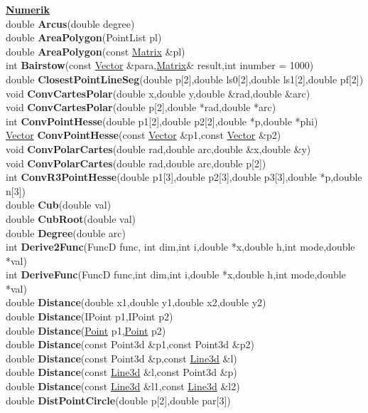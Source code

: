 \documentclass[10pt,titlepage]{article}
\newcommand{\subtitle}[1]{{\noindent\bf#1}}
\def\functionlistentry#1#2#3#4#5#6{\noindent #1 {\bf #2}(#3) \dotfill #6\\}
\begin{document}
{{\subtitle{\hyperlink{SECTION:numeric}{Numerik}}\\
\functionlistentry{double}{Arcus}{double degree}{1348}{numeric}{}
\functionlistentry{double}{AreaPolygon}{PointList pl}{1379}{numeric}{}
\functionlistentry{double}{AreaPolygon}{const \hyperlink{Matrix}{Matrix} \&pl}{1380}{numeric}{}
\functionlistentry{int}{Bairstow}{const \hyperlink{Vector}{Vector} \&para,\hyperlink{Matrix}{Matrix}\& result,int inumber = 1000}{1399}{numeric}{}
\functionlistentry{double}{ClosestPointLineSeg}{double p[2],double ls0[2],double ls1[2],double pf[2]}{1374}{numeric}{}
\functionlistentry{void}{ConvCartesPolar}{double x,double y,double \&rad,double \&arc}{1366}{numeric}{}
\functionlistentry{void}{ConvCartesPolar}{double p[2],double *rad,double *arc}{1367}{numeric}{}
\functionlistentry{int}{ConvPointHesse}{double p1[2],double p2[2],double *p,double *phi}{1370}{numeric}{}
\functionlistentry{\hyperlink{Vector}{Vector}}{ConvPointHesse}{const \hyperlink{Vector}{Vector} \&p1,const \hyperlink{Vector}{Vector} \&p2}{1371}{numeric}{}
\functionlistentry{void}{ConvPolarCartes}{double rad,double arc,double \&x,double \&y}{1368}{numeric}{}
\functionlistentry{void}{ConvPolarCartes}{double rad,double arc,double p[2]}{1369}{numeric}{}
\functionlistentry{int}{ConvR3PointHesse}{double p1[3],double p2[3],double p3[3],double *p,double n[3]}{1393}{numeric}{}
\functionlistentry{double}{Cub}{double val}{1346}{numeric}{}
\functionlistentry{double}{CubRoot}{double val}{1347}{numeric}{}
\functionlistentry{double}{Degree}{double arc}{1349}{numeric}{}
\functionlistentry{int}{Derive2Func}{FuncD func, int dim,int i,double *x,double h,int mode,double *val}{1401}{numeric}{}
\functionlistentry{int}{DeriveFunc}{FuncD func,int dim,int i,double *x,double h,int mode,double *val}{1400}{numeric}{}
\functionlistentry{double}{Distance}{double x1,double y1,double x2,double y2}{1363}{numeric}{}
\functionlistentry{double}{Distance}{IPoint p1,IPoint p2}{1364}{numeric}{}
\functionlistentry{double}{Distance}{\hyperlink{Point}{Point} p1,\hyperlink{Point}{Point} p2}{1365}{numeric}{}
\functionlistentry{double}{Distance}{const Point3d \&p1,const Point3d \&p2}{1384}{numeric}{}
\functionlistentry{double}{Distance}{const Point3d \&p,const \hyperlink{Line3d}{Line3d} \&l}{1385}{numeric}{}
\functionlistentry{double}{Distance}{const \hyperlink{Line3d}{Line3d} \&l,const Point3d \&p}{1386}{numeric}{}
\functionlistentry{double}{Distance}{const \hyperlink{Line3d}{Line3d} \&l1,const \hyperlink{Line3d}{Line3d} \&l2}{1387}{numeric}{}
\functionlistentry{double}{DistPointCircle}{double p[2],double par[3]}{1375}{numeric}{}
}}
\end{document}

